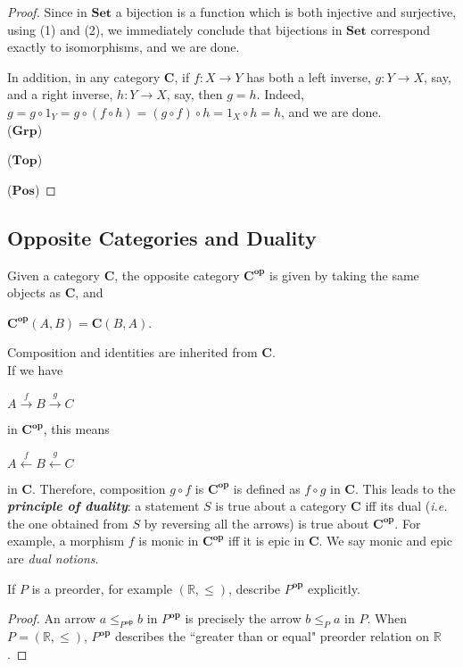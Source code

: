 \documentclass[]{amsbook}
\newcommand{\catname}[1]{\mathbf{#1}}
\newcommand{\R}{\mathbb{R}}
\begin{document}
\begin{proof}
    Since in $\catname{Set}$ a bijection is a function which is both injective
    and surjective, using (1) and (2), we immediately conclude that bijections
    in $\catname{Set}$ correspond exactly to isomorphisms, and we are done.

    In addition, in any category $\catname{C}$, if $f: X \to Y$ has both a left
    inverse, $g: Y \to X$, say, and a right inverse, $h: Y \to X$, say, then
    $g = h$. Indeed, $g = g \circ 1_Y = g \circ (f \circ h) = (g \circ f) \circ
    h = 1_X \circ h = h$, and we are done.\\

    ($\catname{Grp}$)

    ($\catname{Top}$)

    ($\catname{Pos}$)
\end{proof}

\subsection*{Opposite Categories and Duality}
Given a category $\catname{C}$, the opposite category $\catname{C}^{\mathbf{op}}$
is given by taking the same objects as $\catname{C}$, and
\begin{center}
    $\catname{C}^{\mathbf{op}}(A, B) = \catname{C}(B, A)$.
\end{center}

Composition and identities are inherited from $\catname{C}$.\\
If we have
\begin{center}
    $A \xrightarrow{f} B \xrightarrow{g} C$
\end{center}
in $\catname{C}^{\mathbf{op}}$, this means
\begin{center}
    $A \xleftarrow{f} B \xleftarrow{g} C$
\end{center}
in $\catname{C}$. Therefore, composition $ g \circ f$ is
$\catname{C}^{\mathbf{op}}$ is defined as $f \circ g$ in $\catname{C}$. This
leads to the \emph{\textbf{principle of duality}}: a statement $S$ is true
about a category $\catname{C}$ iff its dual (\emph{i.e.} the one obtained
from $S$ by reversing all the arrows) is true about $\catname{C}^{\mathbf{op}}$.
For example, a morphism $f$ is monic in $\catname{C}^{\mathbf{op}}$ iff it is
epic in $\catname{C}$. We say monic and epic are \emph{dual notions}.

\setcounter{Exercise}{13}
\begin{Exercise}
    If $P$ is a preorder, for example $(\R, \le)$, describe $P^{\mathbf{op}}$
    explicitly.
\end{Exercise}
\begin{proof}
    An arrow $a \le_{P^{\mathbf{op}}} b$ in $P^{\mathbf{op}}$ is precisely the
    arrow $b \le_P a$ in $P$. When $P = (\R, \le)$, $P^{\mathbf{op}}$ describes
    the ``greater than or equal" preorder relation on $\R$.
\end{proof}
\end{document}

